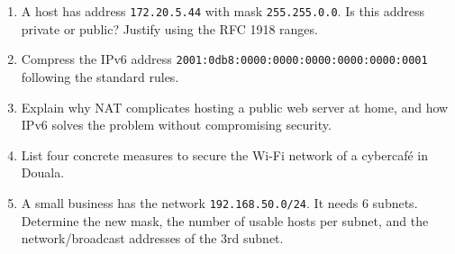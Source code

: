 \documentclass[11pt]{article}
\begin{document}
\begin{exercice}
\begin{enumerate}
\item A host has address \texttt{172.20.5.44} with mask \texttt{255.255.0.0}. Is this address private or public? Justify using the RFC 1918 ranges.
\item Compress the IPv6 address \texttt{2001:0db8:0000:0000:0000:0000:0000:0001} following the standard rules.
\item Explain why NAT complicates hosting a public web server at home, and how IPv6 solves the problem without compromising security.
\item List four concrete measures to secure the Wi-Fi network of a cybercafé in Douala.
\item A small business has the network \texttt{192.168.50.0/24}. It needs 6 subnets. Determine the new mask, the number of usable hosts per subnet, and the network/broadcast addresses of the 3rd subnet.
\end{enumerate}
\end{exercice}
\end{document}
